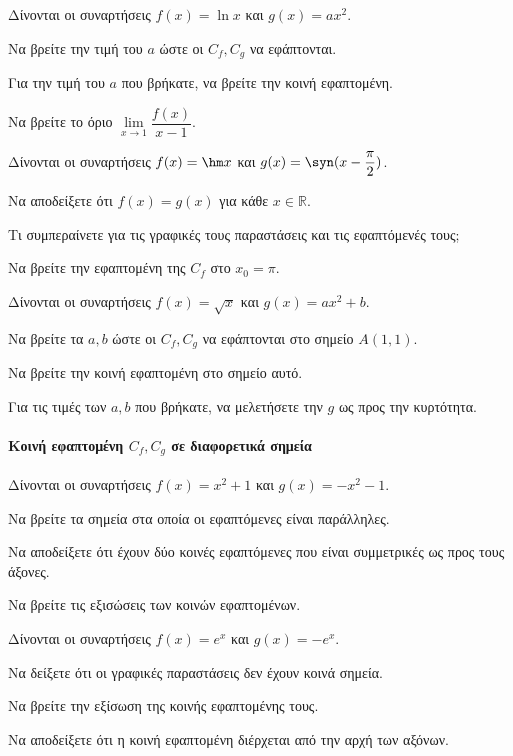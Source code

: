 \documentclass[11pt,a4paper,modern]{FFExercises}
\begin{document}
\askhsh
Δίνονται οι συναρτήσεις $ f(x)=\ln x $ και $ g(x)=ax^2 $.
\begin{alist}
    \item Να βρείτε την τιμή του $ a $ ώστε οι $ C_f, C_g $ να εφάπτονται.
    \item Για την τιμή του $ a $ που βρήκατε, να βρείτε την κοινή εφαπτομένη.
    \item Να βρείτε το όριο $ \lim\limits_{x \to 1} \dfrac{f(x)}{x-1} $.
\end{alist}

\askhsh
Δίνονται οι συναρτήσεις $ f(x)=\hm x $ και $ g(x)=\syn (x-\dfrac{\pi}{2}) $.
\begin{alist}
    \item Να αποδείξετε ότι $ f(x)=g(x) $ για κάθε $ x \in \mathbb{R} $.
    \item Τι συμπεραίνετε για τις γραφικές τους παραστάσεις και τις εφαπτόμενές τους;
    \item Να βρείτε την εφαπτομένη της $ C_f $ στο $ x_0=\pi $.
\end{alist}

\askhsh
Δίνονται οι συναρτήσεις $ f(x)=\sqrt{x} $ και $ g(x)=ax^2+b $.
\begin{alist}
    \item Να βρείτε τα $ a,b $ ώστε οι $ C_f, C_g $ να εφάπτονται στο σημείο $ A(1,1) $.
    \item Να βρείτε την κοινή εφαπτομένη στο σημείο αυτό.
    \item Για τις τιμές των $ a,b $ που βρήκατε, να μελετήσετε την $ g $ ως προς την κυρτότητα.
\end{alist}

\paragraph{Κοινή εφαπτομένη $ C_f,C_g $ σε διαφορετικά σημεία}
\askhsh
Δίνονται οι συναρτήσεις $ f(x)=x^2+1 $ και $ g(x)=-x^2-1 $.
\begin{alist}
    \item Να βρείτε τα σημεία στα οποία οι εφαπτόμενες είναι παράλληλες.
    \item Να αποδείξετε ότι έχουν δύο κοινές εφαπτόμενες που είναι συμμετρικές ως προς τους άξονες.
    \item Να βρείτε τις εξισώσεις των κοινών εφαπτομένων.
\end{alist}

\askhsh
Δίνονται οι συναρτήσεις $ f(x)=e^x $ και $ g(x)=-e^x $.
\begin{alist}
    \item Να δείξετε ότι οι γραφικές παραστάσεις δεν έχουν κοινά σημεία.
    \item Να βρείτε την εξίσωση της κοινής εφαπτομένης τους.
    \item Να αποδείξετε ότι η κοινή εφαπτομένη διέρχεται από την αρχή των αξόνων.
\end{alist}
\end{document}
